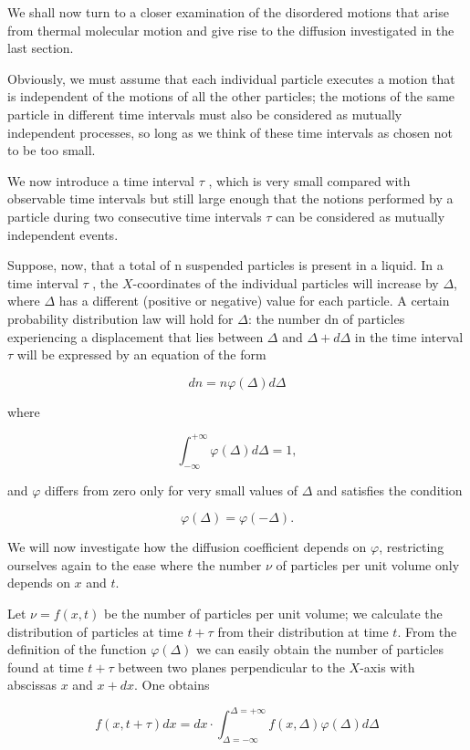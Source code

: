 \documentclass{article}
\begin{document}
We shall now turn to a closer examination of the disordered motions that arise from thermal
molecular motion and give rise to the diffusion investigated in the last section.

Obviously, we must assume that each individual particle executes a motion that is independent
of the motions of all the other particles; the motions of the same particle in different time intervals
must also be considered as mutually independent processes, so long as we think of these time
intervals as chosen not to be too small.

   We now introduce a time interval $\tau$ , which is very small compared with observable time intervals
but still large enough that the notions performed by a particle during two consecutive time intervals
$\tau$ can be considered as mutually independent events.

Suppose, now, that a total of n suspended particles is present in a liquid. In a time interval $\tau$ ,
the $X$-coordinates of the individual particles will increase by $\Delta$, where $\Delta$ has a different (positive or negative) value for each particle. A certain probability distribution law will hold for $\Delta$: the number dn of particles experiencing a displacement that lies between $\Delta$ and $\Delta+d\Delta$ in the time interval $\tau$ will be expressed by an equation of the form

\[dn=n\varphi(\Delta)d\Delta\]

where

\[\int^{+\infty}_{-\infty} \varphi(\Delta)d\Delta=1, \]

and $\varphi$ differs from zero only for very small values of $\Delta$ and satisfies the condition

\[\varphi(\Delta)=\varphi(-\Delta).\]

We will now investigate how the diffusion coefficient depends on $\varphi$, restricting ourselves again
to the ease where the number $\nu$ of particles per unit volume only depends on $x$ and $t$.

Let $\nu = f(x, t)$ be the number of particles per unit volume; we calculate the distribution of
particles at time $t + \tau$ from their distribution at time $t$. From the definition of the function $\varphi(\Delta)$ we can easily obtain the number of particles found at time $t + \tau$ between two planes perpendicular
to the $X$-axis with abscissas $x$ and $x + dx$. One obtains

\[f(x,t+\tau)dx=dx \cdot \int^{\Delta = +\infty}_{\Delta = -\infty} f(x,\Delta)\varphi(\Delta)d\Delta \]
\end{document}
